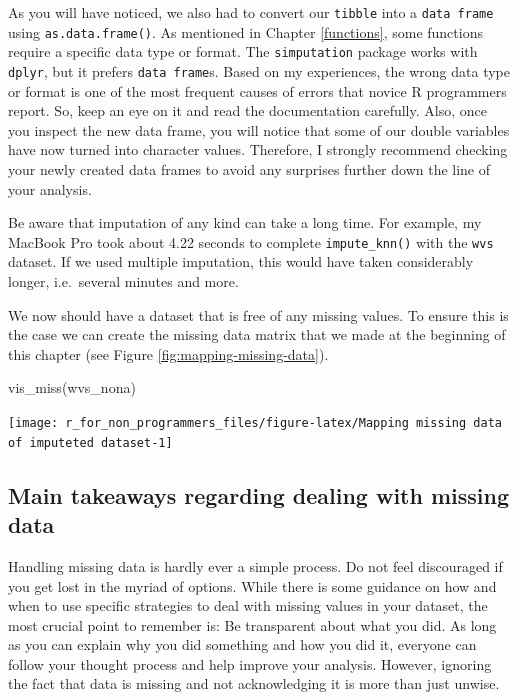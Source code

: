 \documentclass[
]{book}
\newenvironment{Shaded}{\begin{snugshade}}{\end{snugshade}}
\newcommand{\FunctionTok}[1]{\textcolor[rgb]{0.00,0.00,0.00}{#1}}
\newcommand{\NormalTok}[1]{#1}
\begin{document}
As you will have noticed, we also had to convert our \texttt{tibble} into a \texttt{data\ frame} using \texttt{as.data.frame()}. As mentioned in Chapter \ref{functions}, some functions require a specific data type or format. The \texttt{simputation} package works with \texttt{dplyr}, but it prefers \texttt{data\ frame}s. Based on my experiences, the wrong data type or format is one of the most frequent causes of errors that novice R programmers report. So, keep an eye on it and read the documentation carefully. Also, once you inspect the new data frame, you will notice that some of our double variables have now turned into character values. Therefore, I strongly recommend checking your newly created data frames to avoid any surprises further down the line of your analysis.

Be aware that imputation of any kind can take a long time. For example, my MacBook Pro took about 4.22 seconds to complete \texttt{impute\_knn()} with the \texttt{wvs} dataset. If we used multiple imputation, this would have taken considerably longer, i.e.~several minutes and more.

We now should have a dataset that is free of any missing values. To ensure this is the case we can create the missing data matrix that we made at the beginning of this chapter (see Figure \ref{fig:mapping-missing-data}).

\begin{Shaded}
\begin{Highlighting}[]
\FunctionTok{vis\_miss}\NormalTok{(wvs\_nona)}
\end{Highlighting}
\end{Shaded}

\begin{center}\texttt{[image: r\_for\_non\_programmers\_files/figure-latex/Mapping missing data of imputeted dataset-1]} \end{center}

\hypertarget{main-takeaways-regarding-dealing-with-missing-data}{%
\subsection{Main takeaways regarding dealing with missing data}\label{main-takeaways-regarding-dealing-with-missing-data}}

Handling missing data is hardly ever a simple process. Do not feel discouraged if you get lost in the myriad of options. While there is some guidance on how and when to use specific strategies to deal with missing values in your dataset, the most crucial point to remember is: Be transparent about what you did. As long as you can explain why you did something and how you did it, everyone can follow your thought process and help improve your analysis. However, ignoring the fact that data is missing and not acknowledging it is more than just unwise.
\end{document}
